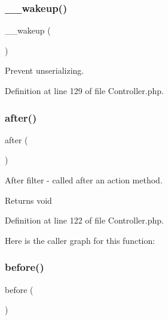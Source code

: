 \subsubsection{\texorpdfstring{\+\_\+\+\_\+wakeup()}{\_\_wakeup()}}
{\footnotesize\ttfamily \+\_\+\+\_\+wakeup (\begin{DoxyParamCaption}{ }\end{DoxyParamCaption})\hspace{0.3cm}{\ttfamily [protected]}}

Prevent unserializing. 

Definition at line 129 of file Controller.\+php.

\mbox{\label{class_zest_1_1_controller_1_1_controller_a1c4f41ef2c0bc555e009e4c937f79f56}} 
\subsubsection{\texorpdfstring{after()}{after()}}
{\footnotesize\ttfamily after (\begin{DoxyParamCaption}{ }\end{DoxyParamCaption})\hspace{0.3cm}{\ttfamily [protected]}}

After filter -\/ called after an action method.

\begin{DoxyReturn}{Returns}
void 
\end{DoxyReturn}


Definition at line 122 of file Controller.\+php.

Here is the caller graph for this function\+:
\mbox{\label{class_zest_1_1_controller_1_1_controller_acfb47e2bfffbf95c232d7562cfc5b6c1}} 
\subsubsection{\texorpdfstring{before()}{before()}}
{\footnotesize\ttfamily before (\begin{DoxyParamCaption}{ }\end{DoxyParamCaption})\hspace{0.3cm}{\ttfamily [protected]}}

